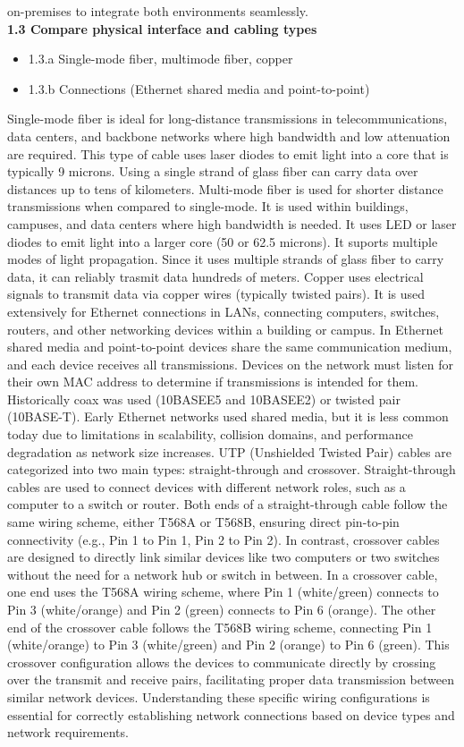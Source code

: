 \documentclass{article}
\begin{document}
on-premises to integrate both environments seamlessly.\\
  
\noindent\textbf{1.3 Compare physical interface and cabling types}
\begin{itemize}
\item 1.3.a Single-mode fiber, multimode fiber, copper
\item 1.3.b Connections (Ethernet shared media and point-to-point)
\end{itemize}
  
	Single-mode fiber is ideal for long-distance transmissions in telecommunications, data centers, and backbone networks where high bandwidth and low attenuation are required. This type of cable uses laser diodes to emit light into a core that is typically 9 microns. Using a single strand of glass fiber can carry data over distances up to tens of kilometers. Multi-mode fiber is used for shorter distance transmissions when compared to single-mode. It is used within buildings, campuses, and data centers where high bandwidth is needed. It uses LED or laser diodes to emit light into a larger core (50 or 62.5 microns). It suports multiple modes of light propagation. Since it uses multiple strands of glass fiber to carry data, it can reliably trasmit data hundreds of meters. Copper uses electrical signals to transmit data via copper wires (typically twisted pairs). It is used extensively for Ethernet connections in LANs, connecting computers, switches, routers, and other networking devices within a building or campus. In Ethernet shared media and point-to-point devices share the same communication medium, and each device receives all transmissions. Devices on the network must listen for their own MAC address to determine if transmissions is intended for them. Historically coax was used (10BASEE5 and 10BASEE2) or twisted pair (10BASE-T). Early Ethernet networks used shared media, but it is less common today due to limitations in scalability, collision domains, and performance degradation as network size increases. UTP (Unshielded Twisted Pair) cables are categorized into two main types: straight-through and crossover. Straight-through cables are used to connect devices with different network roles, such as a computer to a switch or router. Both ends of a straight-through cable follow the same wiring scheme, either T568A or T568B, ensuring direct pin-to-pin connectivity (e.g., Pin 1 to Pin 1, Pin 2 to Pin 2). In contrast, crossover cables are designed to directly link similar devices like two computers or two switches without the need for a network hub or switch in between. In a crossover cable, one end uses the T568A wiring scheme, where Pin 1 (white/green) connects to Pin 3 (white/orange) and Pin 2 (green) connects to Pin 6 (orange). The other end of the crossover cable follows the T568B wiring scheme, connecting Pin 1 (white/orange) to Pin 3 (white/green) and Pin 2 (orange) to Pin 6 (green). This crossover configuration allows the devices to communicate directly by crossing over the transmit and receive pairs, facilitating proper data transmission between similar network devices. Understanding these specific wiring configurations is essential for correctly establishing network connections based on device types and network requirements.
	
\end{document}

